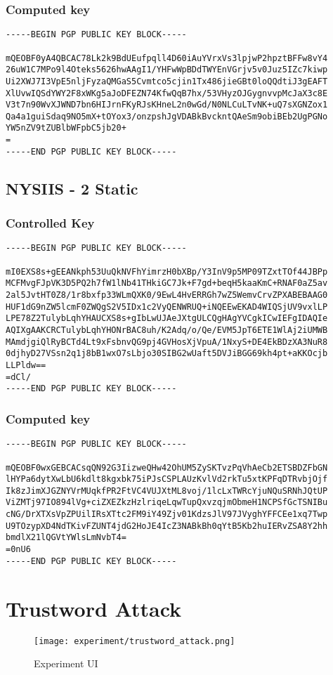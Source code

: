 \subsection{Computed key}
\begin{lstlisting}
-----BEGIN PGP PUBLIC KEY BLOCK-----

mQEOBF0yA4QBCAC78Lk2k9BdUEufpqll4D60iAuYVrxVs3lpjwP2hpztBFFw8vY4
26uW1C7MPo9l4Oteks5626hwAAgI1/YHFwWpBDdTWYEnVGrjv5v0Juz5IZc7kiwp
Ui2XWJ7I3VpE5nljFyzaQMGaS5Cvmtco5cjin1Tx486jieGBt0loQQdtiJ3gEAFT
XlUvwIQSdYWY2F8xWKg5aJoDFEZN74KfwQqB7hx/53VHyzOJGygnvvpMcJaX3c8E
V3t7n90WvXJWND7bn6HIJrnFKyRJsKHneL2n0wGd/N0NLCuLTvNK+uQ7sXGNZox1
Qa4a1guiSdaq9NO5mX+tOYox3/onzpshJgVDABkBvckntQAeSm9obiBEb2UgPGNo
YW5nZV9tZUBlbWFpbC5jb20+
=
-----END PGP PUBLIC KEY BLOCK-----
\end{lstlisting}

\newpage

\section{NYSIIS - 2 Static}
\label{appendix:nysiis_2_static}

\subsection{Controlled Key}
\begin{lstlisting}
-----BEGIN PGP PUBLIC KEY BLOCK-----

mI0EXS8s+gEEANkph53UuQkNVFhYimrzH0bXBp/Y3InV9p5MP09TZxtTOf44JBPp
MCFMvgFJpVK3D5PQ2h7fW1lNb41THkiGC7Jk+F7gd+beqH5kaaKmC+RNAF0aZ5av
2al5JvtHT0Z8/1r8bxfp33WLmQXK0/9EwL4HvERRGh7wZ5WemvCrvZPXABEBAAG0
HUF1dG9nZW5lcmF0ZWQgS2V5IDx1c2VyQENWRUQ+iNQEEwEKAD4WIQSjUV9vxlLP
LPE78Z2TulybLqhYHAUCXS8s+gIbLwUJAeJXtgULCQgHAgYVCgkICwIEFgIDAQIe
AQIXgAAKCRCTulybLqhYHONrBAC8uh/K2Adq/o/Qe/EVM5JpT6ETE1WlAj2iUMWB
MAmdjgiQlRyBCTd4Lt9xFsbnvQG9pj4GVHosXjVpuA/1NxyS+DE4EkBDzXA3NuR8
0djhyD27VSsn2q1j8bB1wxO7sLbjo30SIBG2wUaft5DVJiBGG69kh4pt+aKKOcjb
LLPldw==
=dCl/
-----END PGP PUBLIC KEY BLOCK-----
\end{lstlisting}

\subsection{Computed key}
\begin{lstlisting}
-----BEGIN PGP PUBLIC KEY BLOCK-----

mQEOBF0wxGEBCACsqQN92G3IizweQHw42OhUM5ZySKTvzPqVhAeCb2ETSBDZFbGN
lHYPa6dytXwLbU6kdlt8kgxbk75iPJsCSPLAUzKvlVd2rkTu5xtKPFqDTRvbjOjf
Ik8zJimXJGZNYVrMUqkfPR2FtVC4VUJXtML8voj/1lcLxTWRcYjuNQuSRNhJQtUP
ViZMTj97IO894lVg+ciZXEZkzHzlriqeLqwTupQxvzqjmObmeH1NCPSfGcTSNIBu
cNG/DrXTXsVpZPUilIRsXTtc2FM9iY49Zjv01KdzsJlV97JVyghYFFCEe1xq7Twp
U9TOzypXD4NdTKivFZUNT4jdG2HoJE4IcZ3NABkBh0qYtB5Kb2huIERvZSA8Y2hh
bmdlX21lQGVtYWlsLmNvbT4=
=0nU6
-----END PGP PUBLIC KEY BLOCK-----
\end{lstlisting}

\chapter{Trustword Attack}
\label{appendix:trustword_attack}
\begin{figure}[h!]
    \centering
    \texttt{[image: experiment/trustword\_attack.png]}
    \caption{Experiment UI}
    \label{fig:expID}
\end{figure}